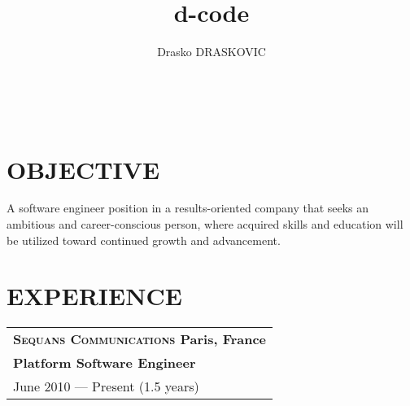 \documentclass[a4paper, oneside, final]{scrartcl}
\title{d-code}
\author{Drasko DRASKOVIC}
\begin{document}

\titleformat{\section}{\large\scshape\raggedright}{}{0em}{}[\titlerule]

\begin{center}

   \textsc{\huge{}}

   \\

\end{center}

\section{OBJECTIVE}
   A software engineer position in a results-oriented company that seeks an
   ambitious and career-conscious person, where acquired skills and education
   will be utilized toward continued growth and advancement.


\section{EXPERIENCE}

\newcommand{\gray}{\rowcolor[gray]{.90}}
   \begin{tabularx}{1.0\linewidth}{X}
      \gray \bf\textsc{\large{Sequans Communications}} \normalfont\hfill Paris, France\\
      \gray \bf{Platform Software Engineer}\\
      \gray June 2010 --- Present (1.5 years) \\
   \end{tabularx}

\medskip
\end{document}
